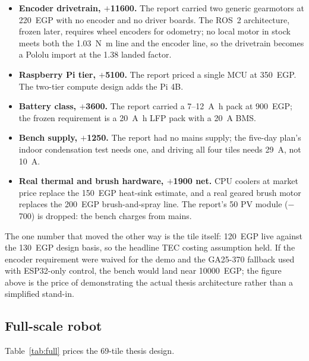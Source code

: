 \documentclass[11pt,a4paper]{article}
\begin{document}
\begin{itemize}[nosep]
  \item \textbf{Encoder drivetrain, $+$\num{11600}.} The report carried two
        generic gearmotors at \num{220}~EGP with no encoder and no driver
        boards. The ROS~2 architecture, frozen later, requires wheel
        encoders for odometry; no local motor in stock meets both the
        \SI{1.03}{\newton\metre} line and the encoder line, so the
        drivetrain becomes a Pololu import at the \num{1.38} landed factor.
  \item \textbf{Raspberry Pi tier, $+$\num{5100}.} The report priced a
        single MCU at \num{350}~EGP. The two-tier compute design adds the
        Pi 4B.
  \item \textbf{Battery class, $+$\num{3600}.} The report carried a
        7--12~\si{\ampere\hour} pack at \num{900}~EGP; the frozen
        requirement is a \SI{20}{\ampere\hour} LFP pack with a
        \SI{20}{\ampere} BMS.
  \item \textbf{Bench supply, $+$\num{1250}.} The report had no mains
        supply; the five-day plan's indoor condensation test needs one, and
        driving all four tiles needs \SI{29}{\ampere}, not \SI{10}{\ampere}.
  \item \textbf{Real thermal and brush hardware, $+$\num{1900} net.} CPU
        coolers at market price replace the \num{150}~EGP heat-sink
        estimate, and a real geared brush motor replaces the
        \num{200}~EGP brush-and-spray line. The report's \SI{50}{\Wp} PV
        module ($-$\num{700}) is dropped: the bench charges from mains.
\end{itemize}

\noindent
The one number that moved the other way is the tile itself: \num{120}~EGP
live against the \num{130}~EGP design basis, so the headline TEC costing
assumption held. If the encoder requirement were waived for the demo and the
GA25-370 fallback used with ESP32-only control, the bench would land near
\num{10000}~EGP; the figure above is the price of demonstrating the actual
thesis architecture rather than a simplified stand-in.

\subsection{Full-scale robot}
Table~\ref{tab:full} prices the 69-tile thesis design.
\end{document}
